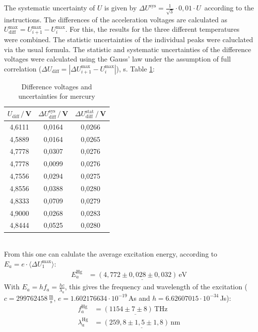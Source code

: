 \documentclass[a4paper,12pt]{article}
\newcommand{\bra}{}
\newcommand{\kla}{}
\newcommand{\tecxt}{}
\begin{document}
The systematic uncertainty of $U$ is given by $\Delta U^\tecxt\text{sys}=\frac{1}{\sqrt{3}}\cdot 0,01\cdot U\,$ according to the instructions. The differences of the acceleration voltages are calculated as $U_\tecxt\text{diff}^\tecxt\text{max}=U_{i+1}^\tecxt\text{max}-U_i^\tecxt\text{max}$. For this, the results for the three different temperatures were combined. The statistic uncertainties of the individual peaks were caluclated via the usual formula. The statistic and systematic uncertainties of the difference voltages were calculated using the Gauss' law under the assumption of full correlation ($\Delta U_\tecxt\text{diff}=|\Delta U_{i+1}^\tecxt\text{max}-U_i^\tecxt\text{max}|$), s. Table \ref{Difference voltages and uncertainties for mercury}:
\begin{table}[h!]
\centering
\begin{tabular}{c|c|c}
$U_\tecxt\text{diff}\,/\,$V&$\Delta U_\tecxt\text{diff}^\tecxt\text{sys}\,/\,$V&$\Delta U_\tecxt\text{diff}^\tecxt\text{stat}\,/\,$V \\ \hline
4,6111&	0,0164&	0,0266 \\ \hline
4,5889&	0,0164&	0,0265\\ \hline
4,7778&	0,0307&	0,0276\\ \hline
4,7778&	0,0099&	0,0276\\ \hline
4,7556&	0,0294	&0,0275\\ \hline
4,8556&	0,0388	&0,0280\\ \hline
4,8333&	0,0709&	0,0279\\ \hline
4,9000&	0,0268&	0,0283\\ \hline
4,8444&	0,0525&	0,0280
\end{tabular}
\caption{Difference voltages and uncertainties for mercury}
\label{Difference voltages and uncertainties for mercury}
\end{table}\\
From this one can calulate the average excitation energy, according to $E_a=e\cdot\bra\langle {\Delta U_1^{\tecxt\text{max}}}\rangle$:
\begin{align*}
E_a^\tecxt\text{Hg}&=\underline{\kla\left( {4,772\pm 0,028\pm 0,032} \right)\,\tecxt\text{eV}}
\end{align*}
With $E_a=hf_a=\frac{hc}{\lambda_a}$, this gives the frequency and wavelength of the excitation ($c = 299762458\,\frac{\tecxt\text{m}}{\tecxt\text{s}}$, $e = 1.602176634 \cdot 10^{-19}\,$As and $h = 6.62607015 \cdot 10^{-34}\,$Js):
\begin{align*}
f_a^\tecxt\text{Hg}&=\underline{\kla\left( {1154\pm 7\pm 8} \right)\,\tecxt\text{THz}} \\
\lambda_a^\tecxt\text{Hg}&=\underline{\kla\left( {259,8\pm 1,5\pm 1,8} \right)\,\tecxt\text{nm}}
\end{align*}
\end{document}
